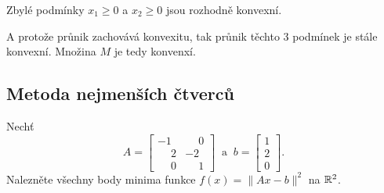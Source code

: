 Zbylé podmínky $x_1 \geq 0$ a $x_2 \geq 0$ jsou rozhodně konvexní. 

A protože průnik zachovává konvexitu, tak průnik těchto 3 podmínek je stále konvexní. Množina $M$ je tedy konvenxí.

\subsection{Metoda nejmenších čtverců}
Nechť
\[
    A = 
    \begin{bmatrix}
    -1 & \phantom{-}0 \\
    \phantom{-}2 & -2 \\
    \phantom{-}0 & \phantom{-}1    
    \end{bmatrix} \: \text{ a } \: b =
    \begin{bmatrix}
        1 \\ 2  \\ 0
    \end{bmatrix}.
\]
Nalezněte všechny body minima funkce $f(x) = \|Ax - b\|^2$ na $\mathbb{R}^2$.

